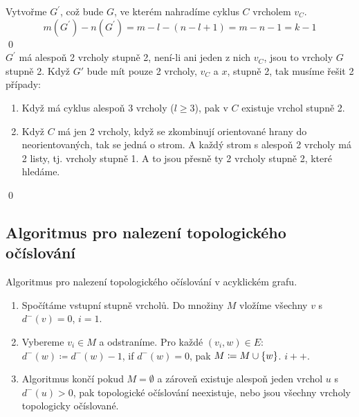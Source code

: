 \begin{itemize}
    Vytvořme $G^\prime$, což bude $G$, ve kterém nahradíme cyklus $C$ vrcholem $v_C$.
    \begin{equation*}
        m(G^\prime) - n(G^\prime) = m - l - (n-l+1) = m-n-1 = k-1
    \end{equation*}
    \hspace{\fill}\qed\\
    $G^\prime$ má alespoň 2 vrcholy stupně 2, není-li ani jeden z nich $v_C$, jsou to vrcholy $G$ stupně 2. Když 
    $G\prime$ bude mít pouze 2 vrcholy, $v_C$ a $x$, stupně 2, tak musíme řešit 2 případy:
    \begin{enumerate}[1)]
        \item Když má cyklus alespoň 3 vrcholy ($l \geq 3$), pak v $C$ existuje vrchol stupně 2.
        \item Když $C$ má jen 2 vrcholy, když se zkombinují orientované hrany do neorientovaných, tak se jedná o strom. 
        A každý strom s alespoň 2 vrcholy má 2 listy, tj. vrcholy stupně 1. A to jsou přesně ty 2 vrcholy stupně 2, 
        které hledáme.
    \end{enumerate}
    \vspace{-1em}
    \hspace{\fill}\qed
\end{itemize}

\subsection{Algoritmus pro nalezení topologického očíslování}
Algoritmus pro nalezení topologického očíslování v acyklickém grafu. \\
\begin{enumerate}[1)]
    \item Spočítáme vstupní stupně vrcholů. Do množiny $M$ vložíme všechny $v$ s $d^{-}(v)=0$, $i=1$.
    \item Vybereme $v_i \in M$ a odstraníme. Pro každé $(v_i,w) \in E$: $d^-(w) \coloneq d^-(w)-1$, if $d^-(w)=0$, pak 
    $M \coloneq M \cup \left\lbrace w \right\rbrace$. $i++$.
    \item Algoritmus končí pokud $M = \emptyset$ a zároveň existuje alespoň jeden vrchol $u$ s $d^-(u) > 0$, pak 
    topologické očíslování neexistuje, nebo jsou všechny vrcholy topologicky očíslované. 
\end{enumerate}